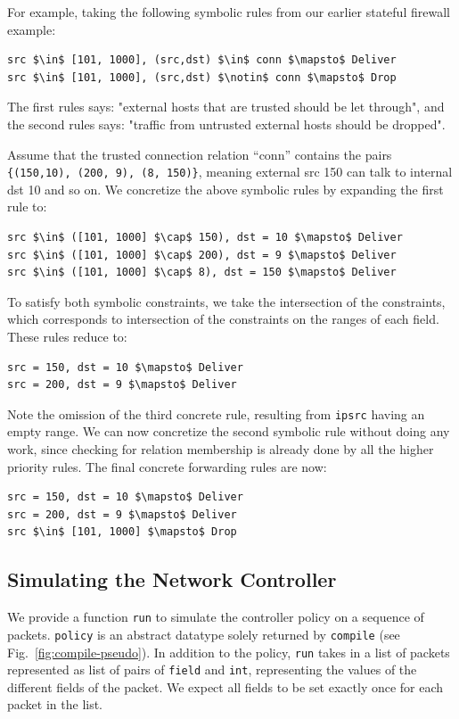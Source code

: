 \documentclass[preprint]{sigplanconf}
\begin{document}
For example, taking the following symbolic rules from our earlier stateful firewall example: 
  \begin{lstlisting}[mathescape]
src $\in$ [101, 1000], (src,dst) $\in$ conn $\mapsto$ Deliver
src $\in$ [101, 1000], (src,dst) $\notin$ conn $\mapsto$ Drop
  \end{lstlisting}
The first rules says: "external hosts that are trusted should be let through", and the second rules says: "traffic from untrusted external hosts should be dropped".
  
  Assume that the trusted connection relation ``conn'' contains the pairs 
  \lstinline| {(150,10), (200, 9), (8, 150)}|, meaning external src 150 can talk to internal dst 10 and so on. We concretize the above symbolic rules by expanding the first rule to:
\begin{lstlisting}[mathescape]
src $\in$ ([101, 1000] $\cap$ 150), dst = 10 $\mapsto$ Deliver
src $\in$ ([101, 1000] $\cap$ 200), dst = 9 $\mapsto$ Deliver
src $\in$ ([101, 1000] $\cap$ 8), dst = 150 $\mapsto$ Deliver
 \end{lstlisting}
To satisfy both symbolic constraints, we take the intersection of the constraints, which corresponds to intersection of the constraints on the ranges of each field. These rules reduce to:
\begin{lstlisting}[mathescape]
src = 150, dst = 10 $\mapsto$ Deliver
src = 200, dst = 9 $\mapsto$ Deliver
 \end{lstlisting}
Note the omission of the third concrete rule, resulting from \lstinline|ipsrc| having an empty range. We can now concretize the second symbolic rule without doing any work, since checking for relation membership is already done by all the higher priority rules. The final concrete forwarding rules are now:
\begin{lstlisting}[mathescape]
src = 150, dst = 10 $\mapsto$ Deliver
src = 200, dst = 9 $\mapsto$ Deliver
src $\in$ [101, 1000] $\mapsto$ Drop
\end{lstlisting}

\subsection*{Simulating the Network Controller}

We provide a function \lstinline|run| to simulate the controller policy on a sequence of packets. \lstinline|policy| is an abstract datatype solely returned by \lstinline|compile| (see Fig.~\ref{fig:compile-pseudo}). In addition to the policy, \lstinline|run| takes in a list of packets represented as list of pairs of \lstinline|field| and \lstinline|int|, representing the values of the different fields of the packet. We expect all fields to be set exactly once for each packet in the list.
\end{document}
